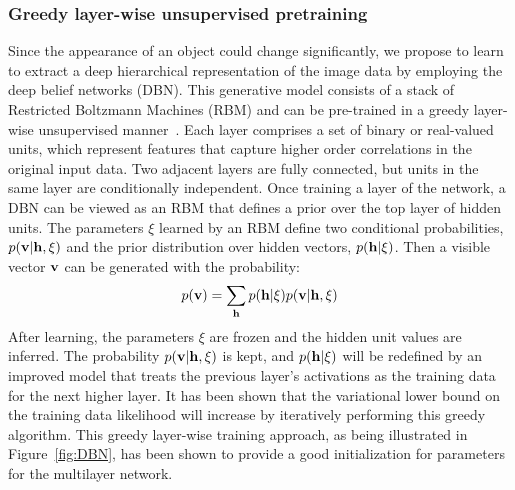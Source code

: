 \documentclass[preprint,12pt,review]{elsarticle}
\begin{document}
\subsubsection{Greedy layer-wise unsupervised pretraining}
Since the appearance of an object could change significantly, we propose to learn to extract a deep hierarchical representation of the image data by employing the deep belief networks (DBN).
This generative model consists of a stack of Restricted Boltzmann Machines (RBM) and can be pre-trained in a greedy layer-wise unsupervised manner~\cite{hinton2006fast}.
Each layer comprises a set of binary or real-valued units, which represent features that capture higher order correlations in the original input data.
Two adjacent layers are fully connected, but units in the same layer are conditionally independent.
Once training a layer of the network, a DBN can be viewed as an RBM that defines a prior over the top layer of hidden units.
The parameters $\xi$ learned by an RBM define two conditional probabilities, $p({\bf{v}}|{\bf{h}},\xi )$ and the prior distribution over hidden vectors, $p({\bf{h}}|\xi)$.
Then a visible vector ${\bf{v}}$ can be generated with the probability:
\begin{equation}
p({\bf{v}}) = \sum\limits_{\bf{h}} {p({\bf{h}}|\xi )} p({\bf{v}}|{\bf{h}},\xi )
\end{equation}
After learning, the parameters $\xi$ are frozen and the hidden unit values are inferred. The probability $p({\bf{v}}|{\bf{h}},\xi )$ is kept, and $p({\bf{h}}|\xi )$ will be redefined by an improved model that treats the previous layer's activations as the training data for the next higher layer.
It has been shown that the variational lower bound on the training data likelihood will increase by iteratively performing this greedy algorithm.
This greedy layer-wise training approach, as being illustrated in Figure~\ref{fig:DBN}, has been shown to provide a good initialization for parameters for the multilayer network.
\end{document}

